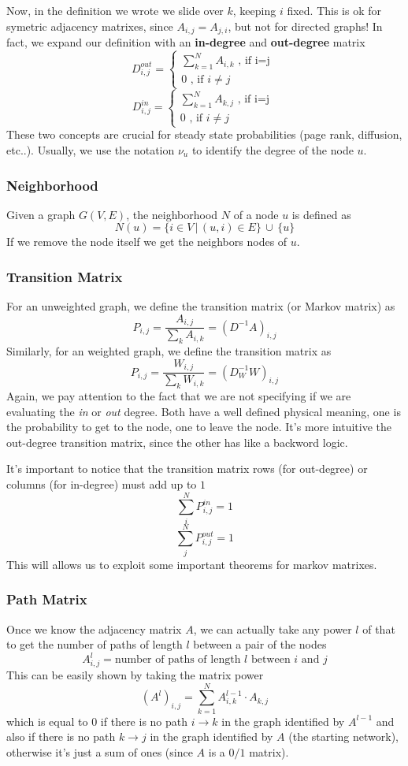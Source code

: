 \documentclass[12pt,a4paper]{article}
\begin{document}
Now, in the definition we wrote we slide over $k$, keeping $i$ fixed. This is ok for symetric adjacency matrixes, since $A_{i,j}=A_{j,i}$, but not for directed graphs! In fact, we expand our definition with an \textbf{in-degree} and \textbf{out-degree} matrix
$$
D^{out}_{i,j} = \begin{cases} \sum_{k=1}^N A_{i,k} \text{ , if i=j }\\[1em]
	0 \text{ , if } i\neq j 
\end{cases}
$$
$$
D^{in}_{i,j} = \begin{cases} \sum_{k=1}^N A_{k,j} \text{ , if i=j }\\[1em]
	0 \text{ , if } i\neq j 
\end{cases}
$$
These two concepts are crucial for steady state probabilities (page rank, diffusion, etc..). Usually, we use the notation $\nu_u$ to identify the degree of the node $u$.

\subsubsection*{Neighborhood}
Given a graph $G(V,E)$, the neighborhood $N$ of a node $u$ is defined as
$$
N(u) = \{i \in V \, | \, (u,i) \in E  \} \, \cup \, \{u\}
$$
If we remove the node itself we get the neighbors nodes of $u$. 

\subsubsection*{Transition Matrix}
For an unweighted graph, we define the transition matrix (or Markov matrix) as
$$
P_{i,j} = \frac{A_{i,j}}{\sum_{k} A_{i,k}} = (D^{-1}A)_{i,j}
$$
Similarly, for an weighted graph, we define the transition matrix as
$$
P_{i,j} = \frac{W_{i,j}}{\sum_{k} W_{i,k}} = (D_W^{-1}W)_{i,j}
$$
Again, we pay attention to the fact that we are not specifying if we are evaluating the \textit{in} or \textit{out} degree. Both have a well defined physical meaning, one is the probability to get to the node, one to leave the node. It's more intuitive the out-degree transition matrix, since the other has like a backword logic.

It's important to notice that the transition matrix rows (for out-degree) or columns (for in-degree) must add up to $1$
$$
\sum_{i}^N P^{in}_{i,j} = 1
$$
$$
\sum_{j}^N P^{out}_{i,j} = 1
$$
This will allows us to exploit some important theorems for markov matrixes.

\subsubsection*{Path Matrix}
Once we know the adjacency matrix $A$, we can actually take any power $l$ of that to get the number of paths of length $l$ between a pair of the nodes
$$
A^l_{i,j} = \text{number of paths of length } l \text{ between } i \text{ and } j
$$
This can be easily shown by taking the matrix power
$$
(A^l)_{i,j} = \sum_{k=1}^N A^{l-1}_{i,k}\cdot A_{k,j}
$$
which is equal to $0$ if there is no path $i\rightarrow k$ in the graph identified by $A^{l-1}$ and also if there is no path $k\rightarrow j$ in the graph identified by $A$ (the starting network), otherwise it's just a sum of ones (since $A$ is a $0/1$ matrix).
\end{document}
